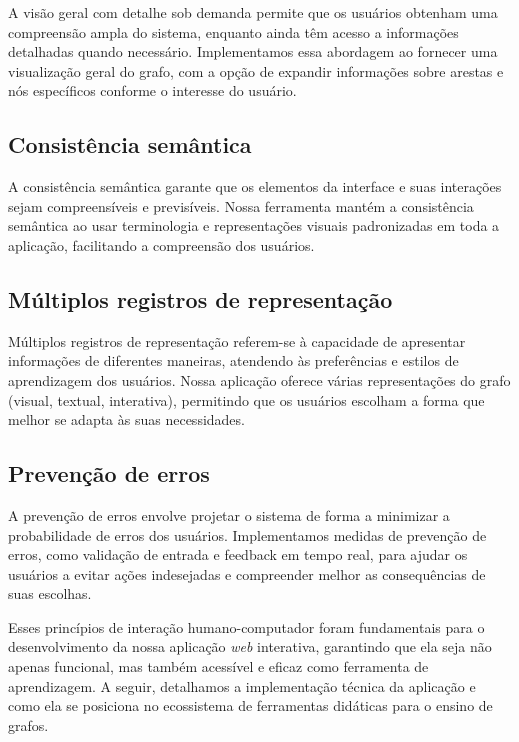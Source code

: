 A visão geral com detalhe sob demanda permite que os usuários obtenham uma compreensão ampla do sistema, enquanto ainda têm acesso a informações detalhadas quando necessário. Implementamos essa abordagem ao fornecer uma visualização geral do grafo, com a opção de expandir informações sobre arestas e nós específicos conforme o interesse do usuário.

\subsection{Consistência semântica}

A consistência semântica garante que os elementos da interface e suas interações sejam compreensíveis e previsíveis. Nossa ferramenta mantém a consistência semântica ao usar terminologia e representações visuais padronizadas em toda a aplicação, facilitando a compreensão dos usuários.

\subsection{Múltiplos registros de representação}

Múltiplos registros de representação referem-se à capacidade de apresentar informações de diferentes maneiras, atendendo às preferências e estilos de aprendizagem dos usuários. Nossa aplicação oferece várias representações do grafo (visual, textual, interativa), permitindo que os usuários escolham a forma que melhor se adapta às suas necessidades.

\subsection{Prevenção de erros}

A prevenção de erros envolve projetar o sistema de forma a minimizar a probabilidade de erros dos usuários. Implementamos medidas de prevenção de erros, como validação de entrada e feedback em tempo real, para ajudar os usuários a evitar ações indesejadas e compreender melhor as consequências de suas escolhas.


Esses princípios de interação humano-computador foram fundamentais para o desenvolvimento da nossa aplicação \textit{web} interativa, garantindo que ela seja não apenas funcional, mas também acessível e eficaz como ferramenta de aprendizagem. A seguir, detalhamos a implementação técnica da aplicação e como ela se posiciona no ecossistema de ferramentas didáticas para o ensino de grafos.

